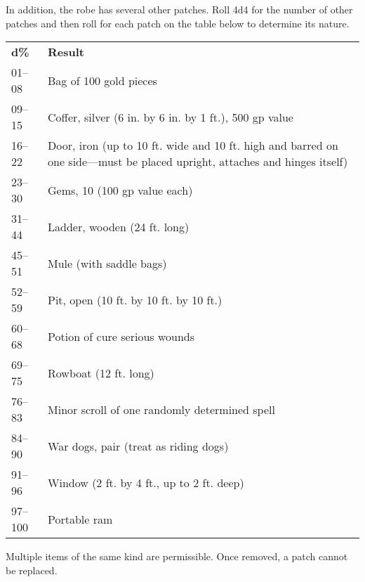 In addition, the robe has several other patches. Roll 4d4 for the number of other patches and then roll for each patch on the table below to determine its nature.
\begin{tabular}{ll}
\textbf{d\%} & \textbf{Result}                                                                                                          \\
01–08        & Bag of 100 gold pieces                                                                                                   \\
09–15        & Coffer, silver (6 in. by 6 in. by 1 ft.), 500 gp value                                                                   \\
16–22        & Door, iron (up to 10 ft. wide and 10 ft. high and barred on one side—must be placed upright, attaches and hinges itself) \\
23–30        & Gems, 10 (100 gp value each)                                                                                             \\
31–44        & Ladder, wooden (24 ft. long)                                                                                             \\
45–51        & Mule (with saddle bags)                                                                                                  \\
52–59        & Pit, open (10 ft. by 10 ft. by 10 ft.)                                                                                   \\
60–68        & Potion of cure serious wounds                                                                                            \\
69–75        & Rowboat (12 ft. long)                                                                                                    \\
76–83        & Minor scroll of one randomly determined spell                                                                            \\
84–90        & War dogs, pair (treat as riding dogs)                                                                                    \\
91–96        & Window (2 ft. by 4 ft., up to 2 ft. deep)                                                                                \\
97–100       & Portable ram                                                                                                            
\end{tabular}				
Multiple items of the same kind are permissible. Once removed, a patch cannot be replaced. 
				
